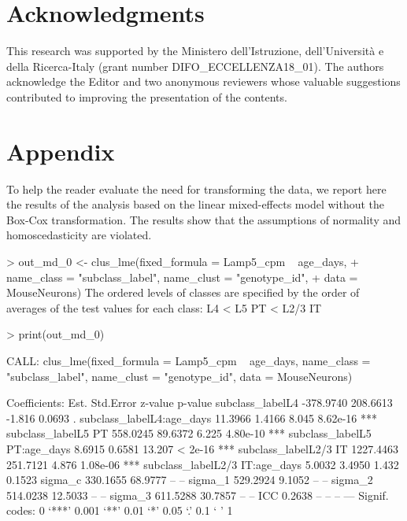\hypertarget{acknowledgments}{%
\section{Acknowledgments}\label{acknowledgments}}
This research was supported by the Ministero dell'Istruzione, dell'Università e della Ricerca-Italy (grant number DIFO\_ECCELLENZA18\_01). {The authors acknowledge the Editor and two anonymous reviewers whose valuable suggestions contributed to improving the presentation of the contents.}



{\color{blue}
\hypertarget{appendix}{%
\section{Appendix}\label{appendix}}

To help the reader evaluate the need for transforming the data, we report here the results of the analysis based on  the linear mixed-effects model without the Box-Cox transformation. The results show that the assumptions of normality and homoscedasticity are violated.


\begin{example}
> out_md_0 <- clus_lme(fixed_formula = Lamp5_cpm ~ age_days,
+                      name_class = "subclass_label", name_clust = "genotype_id",
+                      data = MouseNeurons)
The ordered levels of classes are specified by the order of 
 averages of the test values for each class:
L4 < L5 PT < L2/3 IT  
\end{example}

\begin{example}
> print(out_md_0)

CALL: clus_lme(fixed_formula = Lamp5_cpm ~ age_days, name_class = "subclass_label", 
    name_clust = "genotype_id", data = MouseNeurons)
 
Coefficients:
                                    Est. Std.Error z-value  p-value    
subclass_labelL4               -378.9740  208.6613  -1.816   0.0693 .  
subclass_labelL4:age_days        11.3966    1.4166   8.045 8.62e-16 ***
subclass_labelL5 PT             558.0245   89.6372   6.225 4.80e-10 ***
subclass_labelL5 PT:age_days      8.6915    0.6581  13.207  < 2e-16 ***
subclass_labelL2/3 IT          1227.4463  251.7121   4.876 1.08e-06 ***
subclass_labelL2/3 IT:age_days    5.0032    3.4950   1.432   0.1523    
sigma_c                         330.1655   68.9777      --       --    
sigma_1                         529.2924    9.1052      --       --    
sigma_2                         514.0238   12.5033      --       --    
sigma_3                         611.5288   30.7857      --       --    
ICC                               0.2638        --      --       --    
---
Signif. codes:  0 ‘***’ 0.001 ‘**’ 0.01 ‘*’ 0.05 ‘.’ 0.1 ‘ ’ 1


\end{example}}
